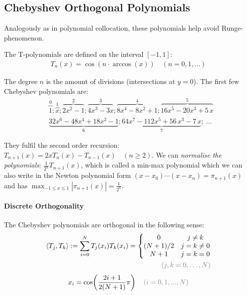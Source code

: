 \subsection{Chebyshev Orthogonal Polynomials}
Analogously as in polynomial collocation, these polynomials help avoid Runge-phenomenon.

The T-polynomials are defined on the interval $[-1,1]$:
\begin{align*}
    T_n(x)=\cos(n\cdot \arccos(x))\quad (n=0,1,\ldots)
\end{align*}

The degree $n$ is the amount of divisions (intersections at $y=0$).
The first few Chebyshev polynomials are:
\begin{align*}
    & \overbrace{1}^{0};\overbrace{x}^{1};\overbrace{2x^2-1}^{2};\overbrace{4x^3-3x}^{3};\overbrace{8x^4 - 8x^2 + 1}^{4};
    \overbrace{16x^{5}-20x^{3}+5\,x}^{5} \\
    & \underbrace{32x^{6}-48x^{4}+18x^{2}-1}_{6};\underbrace{64x^{7}-112x^{5}+56\,x^{3}-7\,x}_{7};\ \ldots
\end{align*}

They fulfil the second order recursion:
\colorbox{shadecolor}{$T_{n+1}(x)=2xT_n(x)-T_{n-1}(x)\quad(n\geq 2)$}.
We can \emph{normalise the polynomials}: $\frac{1}{2^n}T_{n+1}(x)$,
which is called a min-max polynomial which we can also write in the Newton polynomial form $(x-x_0)\cdots(x-x_n)=\pi_{n+1}(x)$
and has $\max_{-1\leq x \leq 1}|\pi_{n+1}(x)|=\frac{1}{2^n}$.

\paragraph{Discrete Orthogonality}

The Chebyshev polynomials are orthogonal in the following sense:
\begin{align*}
    \langle T_{j},T_{k}\rangle := \sum_{i=0}^{N}T_{j}(x_{i})T_{k}(x_{i})
    =
    \left\{
    \begin{matrix}
        0       & j \neq k \\
        (N+1)/2 & j = k \neq 0 \\
        N+1     & j=k=0
    \end{matrix}
    \right. \\
    {\color{gray} (j,k=0,\ldots,N)}
\end{align*}
\begin{align*}
    x_{i}=\cos\!\left({\frac{2i+1}{2(N+1)}}\pi\right)\quad{\color{gray} (i=0,1,...,N)}
\end{align*}

